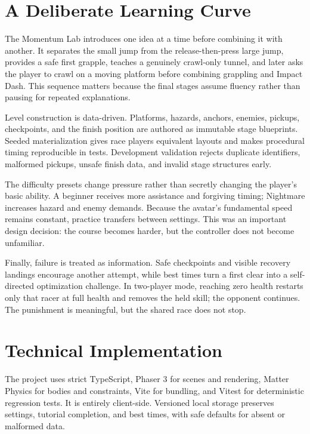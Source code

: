 \documentclass[11pt,letterpaper]{article}
\begin{document}
\section{A Deliberate Learning Curve}

The Momentum Lab introduces one idea at a time before combining it with another. It separates the small jump from the release-then-press large jump, provides a safe first grapple, teaches a genuinely crawl-only tunnel, and later asks the player to crawl on a moving platform before combining grappling and Impact Dash. This sequence matters because the final stages assume fluency rather than pausing for repeated explanations.

Level construction is data-driven. Platforms, hazards, anchors, enemies, pickups, checkpoints, and the finish position are authored as immutable stage blueprints. Seeded materialization gives race players equivalent layouts and makes procedural timing reproducible in tests. Development validation rejects duplicate identifiers, malformed pickups, unsafe finish data, and invalid stage structures early.

The difficulty presets change pressure rather than secretly changing the player's basic ability. A beginner receives more assistance and forgiving timing; Nightmare increases hazard and enemy demands. Because the avatar's fundamental speed remains constant, practice transfers between settings. This was an important design decision: the course becomes harder, but the controller does not become unfamiliar.

Finally, failure is treated as information. Safe checkpoints and visible recovery landings encourage another attempt, while best times turn a first clear into a self-directed optimization challenge. In two-player mode, reaching zero health restarts only that racer at full health and removes the held skill; the opponent continues. The punishment is meaningful, but the shared race does not stop.

\newpage

\section{Technical Implementation}

The project uses strict TypeScript, Phaser 3 for scenes and rendering, Matter Physics for bodies and constraints, Vite for bundling, and Vitest for deterministic regression tests. It is entirely client-side. Versioned local storage preserves settings, tutorial completion, and best times, with safe defaults for absent or malformed data.
\end{document}
